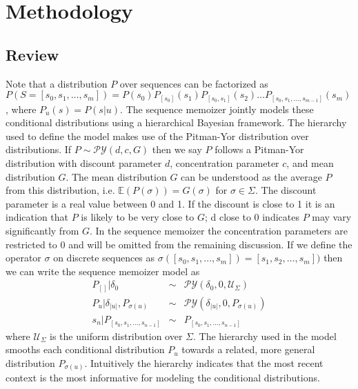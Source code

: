 \section{Methodology}
\label{section:methodology}
\newcommand{\PY}{\ensuremath{\mathcal{P}\mathcal{Y}}}

\subsection{Review}

Note that a distribution $P$ over sequences can be factorized as $P(S = [s_0, s_1, \ldots, s_m]) = P(s_0)P_{[s_0]}(s_1)P_{[s_0,s_1]}(s_2) \ldots P_{[s_0,s_1,\ldots,s_{m-1}]}(s_m)$, where $P_u(s) = P(s | u)$.  The sequence memoizer jointly models these conditional distributions using a hierarchical Bayesian framework.  The hierarchy used to define the model makes use of the Pitman-Yor \citep{Pitman1997} distribution over distributions. If $P \sim \PY(d,c,G)$ then we say $P$ follows a Pitman-Yor distribution with discount parameter $d$, concentration parameter $c$, and mean distribution $G$.  The mean distribution $G$ can be understood as the average $P$ from this distribution, i.e. $\mathbb{E}(P(\sigma)) = G(\sigma)$ for $\sigma \in \Sigma$.  The discount parameter is a real value between 0 and 1.  If the discount is close to 1 it is an indication that $P$ is likely to be very close to $G$; d close to 0 indicates $P$ may vary significantly from $G$.  In the sequence memoizer the concentration parameters are restricted to 0 and will be omitted from the remaining discussion. If we define the operator $\sigma$ on discrete sequences as $\sigma([s_0, s_1, \ldots, s_m]) = [s_1,s_2, \ldots, s_m])$ then we can write the sequence memoizer model as 
%
\[
\begin{array}{rcl}
	P_{[ ]} 	|	\delta_0 					& \sim & \PY(\delta_0,0,\mathcal{U}_{\Sigma})\\
	P_{u} 	| 	\delta_{|u|}, P_{\sigma(u)} 	& \sim & \PY(\delta_{|u|}, 0, P_{\sigma(u)}) \\
	s_n 		|  	P_{[s_0, s_1, \ldots, s_{n-1}] }	& \sim & P_{[s_0, s_1, \ldots, s_{n-1}] }
\end{array}
\]
%
\noindent where $\mathcal{U}_{\Sigma}$ is the uniform distribution over $\Sigma$.  The hierarchy used in the model smooths each conditional distribution $P_u$ towards a related, more general distribution $P_{\sigma(u)}$.  Intuitively the hierarchy indicates that the most recent context is the most informative for modeling the conditional distributions.

